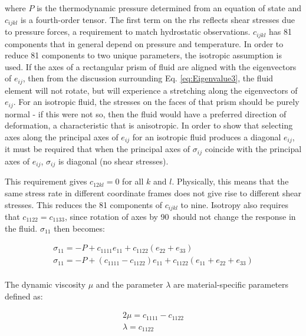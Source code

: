\documentclass[10pt]{article}
\numberwithin{equation}{section} %
\begin{document}
where \(P\) is the thermodynamic pressure determined from an equation of state and \(c_{ijkl}\) is a fourth-order tensor. The first term on the \gls{rhs} reflects shear stresses due to pressure forces, a requirement to match hydrostatic observations. \(c_{ijkl}\) has 81 components that in general depend on pressure and temperature. In order to reduce 81 components to two unique parameters, the isotropic assumption is used. If the axes of a rectangular prism of fluid are aligned with the eigenvectors of \(e_{ij}\), then from the discussion surrounding Eq. \eqref{eq:Eigenvalue3}, the fluid element will not rotate, but will experience a stretching along the eigenvectors of \(e_{ij}\). For an isotropic fluid, the stresses on the faces of that prism should be purely normal - if this were not so, then the fluid would have a preferred direction of deformation, a characteristic that is anisotropic. In order to show that selecting axes along the principal axes of \(e_{ij}\) for an isotropic fluid produces a diagonal \(e_{ij}\), it must be required that when the principal axes of \(\sigma_{ij}\) coincide with the principal axes of \(e_{ij}\), \(\sigma_{ij}\) is diagonal (no shear stresses). 

This requirement gives \(c_{12kl}=0\) for all \(k\) and \(l\). Physically, this means that the same stress rate in different coordinate frames does not give rise to different shear stresses. This reduces the 81 components of \(c_{ijkl}\) to nine. Isotropy also requires that \(c_{1122}=c_{1133}\), since rotation of axes by 90\degree\ should not change the response in the fluid. \(\sigma_{11}\) then becomes:

\begin{equation}
\label{eq:StressesNewtonian}
\begin{aligned}
\sigma_{11}=-P+c_{1111}e_{11}+c_{1122}(e_{22}+e_{33})\\
\sigma_{11}=-P+(c_{1111}-c_{1122})e_{11}+c_{1122}(e_{11}+e_{22}+e_{33})\\
\end{aligned}
\end{equation}

The dynamic viscosity \(\mu\) and the parameter \(\lambda\) are material-specific parameters defined as:

\begin{equation}
\begin{aligned}
\label{eq:Lame}
2\mu=c_{1111}-c_{1122}\\
\lambda=c_{1122}\\
\end{aligned}
\end{equation}
\end{document}
